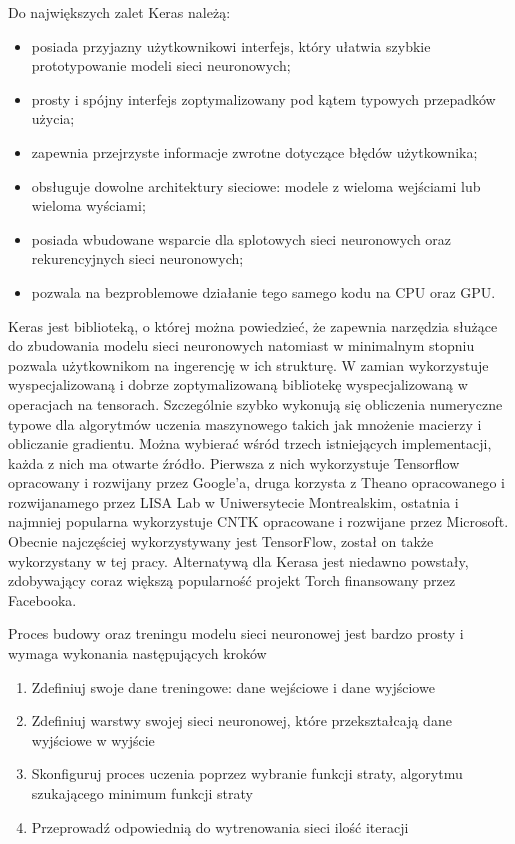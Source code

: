 \documentclass[11pt]{book}
\theoremstyle{definition}
\begin{document}
Do największych zalet Keras należą:
\begin{itemize}
	\setlength\itemsep{0.em}
	
	\item  posiada przyjazny użytkownikowi interfejs, który ułatwia szybkie prototypowanie modeli sieci neuronowych;
	\item  prosty i spójny interfejs zoptymalizowany pod kątem typowych przepadków użycia;
	\item  zapewnia przejrzyste informacje zwrotne dotyczące błędów użytkownika;
	\item  obsługuje dowolne architektury sieciowe: modele z wieloma wejściami lub wieloma wyściami;
	\item posiada wbudowane wsparcie dla splotowych sieci neuronowych oraz rekurencyjnych sieci neuronowych;
	\item  pozwala na bezproblemowe działanie tego samego kodu na CPU oraz GPU.
\end{itemize}
%
Keras jest biblioteką, o której można powiedzieć, że zapewnia narzędzia służące do zbudowania modelu sieci neuronowych natomiast w minimalnym stopniu pozwala użytkownikom na ingerencję w ich strukturę. W zamian wykorzystuje wyspecjalizowaną i dobrze zoptymalizowaną bibliotekę wyspecjalizowaną w operacjach na tensorach. Szczególnie szybko wykonują się obliczenia numeryczne typowe dla algorytmów uczenia maszynowego takich jak mnożenie macierzy i obliczanie gradientu.  Można wybierać wśród trzech istniejących implementacji, każda z nich ma otwarte źródło. Pierwsza z nich wykorzystuje Tensorflow opracowany i rozwijany przez Google'a, druga korzysta z Theano opracowanego i rozwijanamego przez LISA Lab w Uniwersytecie Montrealskim, ostatnia i najmniej popularna wykorzystuje CNTK opracowane i rozwijane przez Microsoft. Obecnie najczęściej wykorzystywany jest TensorFlow, został on także wykorzystany w tej pracy. Alternatywą dla Kerasa jest niedawno powstały, zdobywający coraz większą popularność projekt Torch finansowany przez Facebooka. 
%

Proces budowy oraz treningu modelu sieci neuronowej jest bardzo prosty i wymaga wykonania następujących kroków
\begin{enumerate}
	\setlength\itemsep{0.em}
	\item Zdefiniuj swoje dane treningowe: dane wejściowe i dane wyjściowe
	\item Zdefiniuj warstwy swojej sieci neuronowej, które przekształcają dane wyjściowe w wyjście
	\item Skonfiguruj proces uczenia poprzez wybranie funkcji straty, algorytmu szukającego minimum funkcji straty
	\item Przeprowadź odpowiednią do wytrenowania sieci ilość iteracji
\end{enumerate}
\end{document}
